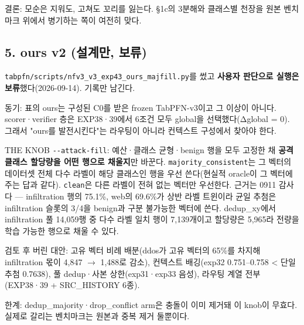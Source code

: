 결론: 모순은 지워도, 고쳐도 꼬리를 잃는다. §1c의 3분해와 클래스별 천장을 원본 벤치마크 위에서 병기하는 쪽이 여전히 맞다.

\subsection{5. ours v2 (설계만, 보류)}
\texttt{tabpfn/\allowbreak{}\allowbreak{}s\allowbreak{}cripts/\allowbreak{}\allowbreak{}n\allowbreak{}fv3\_\allowbreak{}\allowbreak{}v3\_\allowbreak{}\allowbreak{}e\allowbreak{}xp43\_\allowbreak{}\allowbreak{}our\allowbreak{}s\_\allowbreak{}\allowbreak{}majfil\allowbreak{}l.\allowbreak{}py}를 썼고 \textbf{사용자 판단으로 실행은 보류}했다(2026-09-14). 기록만 남긴다.

동기: 표의 ours는 구성된 C0를 받은 frozen TabPFN-v3이고 그 이상이 아니다. scorer·verifier 층은 EXP38·39에서 6조건 모두 global을 선택했다(Δglobal =\allowbreak{} 0). 그래서 "ours를 발전시킨다"는 라우팅이 아니라 컨텍스트 구성에서 찾아야 한다.

THE KNOB \texttt{-\allowbreak{}-\allowbreak{}attack\allowbreak{}-\allowbreak{}fill}: 예산·클래스 균형·benign 행을 모두 고정한 채 \textbf{공격 클래스 할당량을 어떤 행으로 채울지}만 바꾼다. \texttt{majority\allowbreak{}\_\allowbreak{}\allowbreak{}consist\allowbreak{}ent}는 그 벡터의 데이터셋 전체 다수 라벨이 해당 클래스인 행을 우선 쓴다(현실적 oracle이 그 벡터에 주는 답과 같다). \texttt{clean}은 다른 라벨이 전혀 없는 벡터만 우선한다. 근거는 0911 감사다 — infiltration 행의 75.1\%, web의 69.6\%가 상반 라벨 트윈이라 균일 추첨은 infiltration 슬롯의 3/\allowbreak{}4을 benign과 구분 불가능한 벡터에 쓴다. dedup\_\allowbreak{}xy에서 infiltration 풀 14,059행 중 다수 라벨 일치 행이 7,139개이고 할당량은 5,965라 전량을 학습 가능한 행으로 채울 수 있다.

검토 후 버린 대안: 고유 벡터 비례 배분(ddos가 고유 벡터의 65\%를 차지해 infiltration 몫이 4,847  \ensuremath{\rightarrow}  1,488로 감소), 컨텍스트 배깅(exp32 0.751–0.758 < 단일 추첨 0.7638), 풀 dedup·사본 상한(exp31·exp33 음성), 라우팅 계열 전부(EXP38·39 +\allowbreak{} SRC\_\allowbreak{}HISTORY 6종).

한계: dedup\_\allowbreak{}majority·drop\_\allowbreak{}conflict arm은 충돌이 이미 제거돼 이 knob이 무효다. 실제로 갈리는 벤치마크는 원본과 중복 제거 둘뿐이다.

